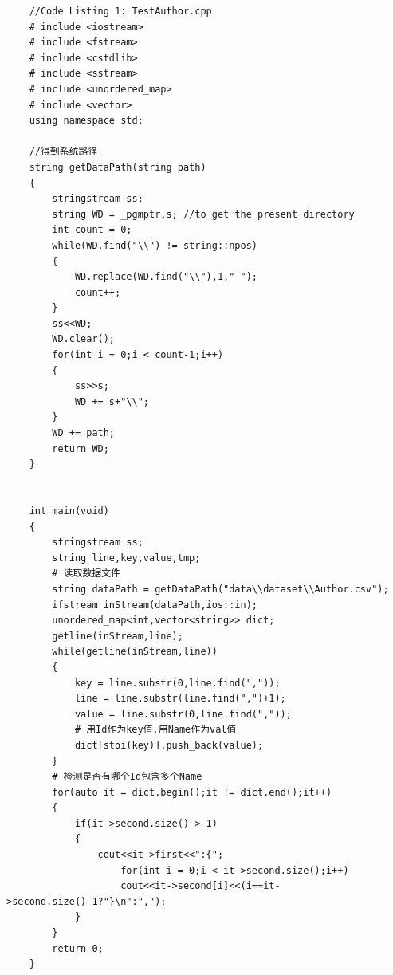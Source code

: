 \documentclass{mcmthesis}
\begin{document}
		{\setmainfont{Courier New Bold}               
			\begin{lstlisting}
	//Code Listing 1: TestAuthor.cpp
	# include <iostream>
	# include <fstream>
	# include <cstdlib>
	# include <sstream>
	# include <unordered_map>
	# include <vector>
	using namespace std;
	
	//得到系统路径
	string getDataPath(string path) 
	{
		stringstream ss;
		string WD = _pgmptr,s; //to get the present directory
		int count = 0;
		while(WD.find("\\") != string::npos) 
		{
			WD.replace(WD.find("\\"),1," ");
			count++;
		}
		ss<<WD;
		WD.clear();
		for(int i = 0;i < count-1;i++) 
		{
			ss>>s;
			WD += s+"\\";
		}
		WD += path;
		return WD;
	}
	
	
	int main(void)
	{
		stringstream ss;
		string line,key,value,tmp;
		# 读取数据文件
		string dataPath = getDataPath("data\\dataset\\Author.csv");
		ifstream inStream(dataPath,ios::in);
		unordered_map<int,vector<string>> dict;
		getline(inStream,line);
		while(getline(inStream,line))
		{
			key = line.substr(0,line.find(","));
			line = line.substr(line.find(",")+1);
			value = line.substr(0,line.find(","));
			# 用Id作为key值,用Name作为val值
			dict[stoi(key)].push_back(value);
		}
		# 检测是否有哪个Id包含多个Name
		for(auto it = dict.begin();it != dict.end();it++)
		{
			if(it->second.size() > 1)
			{
				cout<<it->first<<":{";
					for(int i = 0;i < it->second.size();i++)
					cout<<it->second[i]<<(i==it->second.size()-1?"}\n":",");
			}
		}
		return 0;
	}
			\end{lstlisting}
		}
\end{document}
